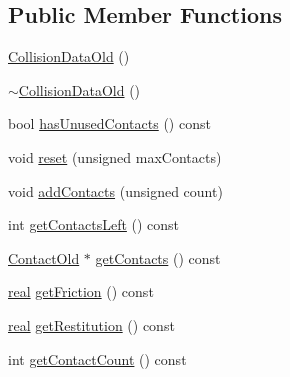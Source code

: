 \subsection*{Public Member Functions}
\begin{DoxyCompactItemize}
\item 
\mbox{\hyperlink{classr3_1_1_collision_data_old_a707e8f38c09df2da7d7ae6a52e418379}{Collision\+Data\+Old}} ()
\item 
\mbox{\hyperlink{classr3_1_1_collision_data_old_a7afc80cbab2af8ed71fcce5064dcf518}{$\sim$\+Collision\+Data\+Old}} ()
\item 
bool \mbox{\hyperlink{classr3_1_1_collision_data_old_a84bd3d8cbf7b3b2f26f31c8a1e1d6b0e}{has\+Unused\+Contacts}} () const
\item 
void \mbox{\hyperlink{classr3_1_1_collision_data_old_a30b66c4a32bd509ee6cd72d7a3e41ef0}{reset}} (unsigned max\+Contacts)
\item 
void \mbox{\hyperlink{classr3_1_1_collision_data_old_ae2b77d8254b53bfa4640ea3ad833370c}{add\+Contacts}} (unsigned count)
\item 
int \mbox{\hyperlink{classr3_1_1_collision_data_old_a78d2328616c76e498822df4cb0690832}{get\+Contacts\+Left}} () const
\item 
\mbox{\hyperlink{classr3_1_1_contact_old}{Contact\+Old}} $\ast$ \mbox{\hyperlink{classr3_1_1_collision_data_old_a5df14bfb6d789df7663b64306756eb96}{get\+Contacts}} () const
\item 
\mbox{\hyperlink{namespacer3_ab2016b3e3f743fb735afce242f0dc1eb}{real}} \mbox{\hyperlink{classr3_1_1_collision_data_old_af6d03fd7fe8df176e9e8860e7d1d4119}{get\+Friction}} () const
\item 
\mbox{\hyperlink{namespacer3_ab2016b3e3f743fb735afce242f0dc1eb}{real}} \mbox{\hyperlink{classr3_1_1_collision_data_old_a3546df5d0d82e690c12f0899bc683d35}{get\+Restitution}} () const
\item 
int \mbox{\hyperlink{classr3_1_1_collision_data_old_a7bdf6b83595d88f4e716bf74a1a1ab3c}{get\+Contact\+Count}} () const
\end{DoxyCompactItemize}
